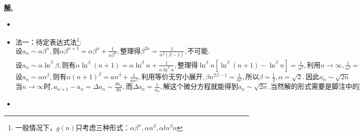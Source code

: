 \documentclass[10pt,a4paper]{book}
\theoremstyle{thmstyle} %
\theoremstyle{defstyle} %
\theoremstyle{prostyle} %
\newenvironment{solution}{\par\underline{\textbf{解.}} \;\kaishu}{\par}
\begin{document}
	\begin{solution}
		\begin{itemize}
			\item 	
		
			\item 
			法一：待定表达式法\footnote{一般情况下，$g(n)$只考虑三种形式：$\alpha\beta^n, \alpha n^\beta, \alpha ln^\beta n$}: \\
			$
			\text{设}a_n\sim \alpha \beta ^n, \text{则}\alpha \beta ^{n+1}=\alpha \beta ^n+\frac{1}{\alpha \beta ^n}, \text{整理得}\beta ^{2n}=\frac{1}{\alpha ^2\left( \beta -1 \right)}, \text{不可能}. 
			$
			\\
			$
			\text{设}a_n\sim \alpha \ln ^{\beta}\beta , \text{则有}\alpha \ln ^{\beta}\left( n+1 \right) =\alpha \ln ^{\beta}n+\frac{1}{\alpha \ln ^{\beta}n}, \text{整理得}\ln ^{\beta}n\left[ \ln ^{\beta}\left( n+1 \right) -\ln ^{\beta}n \right] =\frac{1}{\alpha ^2}, \text{利用}n\rightarrow\infty , \frac{1}{\alpha ^2}=\ln ^{\beta}n\ln ^{\beta}\left( 1+\frac{1}{n} \right) =\left( \frac{\ln n}{n} \right) ^{\beta}\rightarrow 0, \text{不可能}. 
			$\\
			$
			\text{设}a_n\sim \alpha n^{\beta}, \text{则有}\alpha \left( n+1 \right) ^{\beta}=an^{\beta}+\frac{1}{an^{\beta}}, \text{利用等价无穷小展开}, \beta n^{2\beta -1}=\frac{1}{\alpha ^2}, \text{所以}\beta =\frac{1}{2}, \alpha =\sqrt{2}.\ \text{因此}a_n\sim \sqrt{2n}
			$
			$
			\text{当}n\rightarrow \infty \text{时},a_{n+1}-a_n=\Delta a_n\sim \frac{da_n}{dn},\text{而}\Delta a_n=\frac{1}{a_n},\text{解这个微分方程就能得到}a_n\sim \sqrt{2n}.\text{当然解的形式需要是脚注中的那三种之一,否则解可能不符合题意}.
			$
			\item 
		\end{itemize}
	\end{solution}
	
\end{document}
